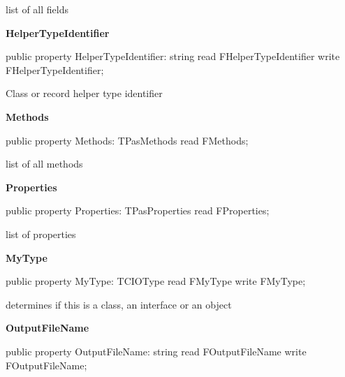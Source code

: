 \documentclass{report}
\newif\ifpdf
\begin{document}
\begin{list}{}
\begin{flushleft}
\ifpdf
\end{flushleft}
\fi


\par list of all fields\label{PasDoc_Items.TPasCio-HelperTypeIdentifier}
\item[\textbf{HelperTypeIdentifier}\hfill]
\ifpdf
\begin{flushleft}
\fi
\begin{ttfamily}
public property HelperTypeIdentifier: string read  FHelperTypeIdentifier
                                          write FHelperTypeIdentifier;\end{ttfamily}

\ifpdf
\end{flushleft}
\fi


\par Class or record helper type identifier\label{PasDoc_Items.TPasCio-Methods}
\item[\textbf{Methods}\hfill]
\ifpdf
\begin{flushleft}
\fi
\begin{ttfamily}
public property Methods: TPasMethods read FMethods;\end{ttfamily}

\ifpdf
\end{flushleft}
\fi


\par list of all methods\label{PasDoc_Items.TPasCio-Properties}
\item[\textbf{Properties}\hfill]
\ifpdf
\begin{flushleft}
\fi
\begin{ttfamily}
public property Properties: TPasProperties read FProperties;\end{ttfamily}

\ifpdf
\end{flushleft}
\fi


\par list of properties\label{PasDoc_Items.TPasCio-MyType}
\item[\textbf{MyType}\hfill]
\ifpdf
\begin{flushleft}
\fi
\begin{ttfamily}
public property MyType: TCIOType read FMyType write FMyType;\end{ttfamily}

\ifpdf
\end{flushleft}
\fi


\par determines if this is a class, an interface or an object\label{PasDoc_Items.TPasCio-OutputFileName}
\item[\textbf{OutputFileName}\hfill]
\ifpdf
\begin{flushleft}
\fi
\begin{ttfamily}
public property OutputFileName: string read FOutputFileName write FOutputFileName;\end{ttfamily}


\end{flushleft}
\end{list}
\end{document}

